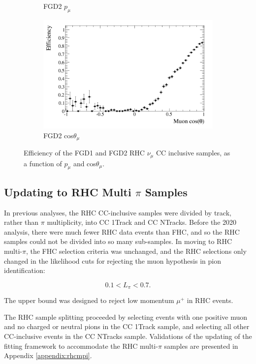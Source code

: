 \begin{figure}
\begin{subfigure}{.48\textwidth}
  \caption{FGD2 $p_{\mu}$}
\end{subfigure}
\begin{subfigure}{.48\textwidth}
  \centering
  \includegraphics[width=0.95\linewidth]{figs/effcosfgd2nuinnubar}
  \caption{FGD2 cos$\theta_{\mu}$}
\end{subfigure}
\caption{Efficiency of the FGD1 and FGD2 RHC $\nu_{\mu}$ CC inclusive samples, as a function of $p_{\mu}$ and cos$\theta_{\mu}$.}
\label{fig:nuinnubareff}
\end{figure}

\subsection{Updating to RHC Multi $\pi$ Samples}

In previous analyses, the RHC CC-inclusive samples were divided by track, rather than $\pi$ multiplicity, into CC 1Track and CC NTracks. Before the 2020 analysis, there were much fewer RHC data events than FHC, and so the RHC samples could not be divided into so many sub-samples. In moving to RHC multi-$\pi$, the FHC selection criteria was unchanged, and the RHC selections only changed in the likelihood cuts for rejecting the muon hypothesis in pion identification:

\begin{equation}
0.1 < L_{\pi} < 0.7.
\end{equation}

The upper bound was designed to reject low momentum $\mu^+$ in RHC events. 

The RHC sample splitting proceeded by selecting events with one positive muon and no charged or neutral pions in the CC 1Track sample, and selecting all other CC-inclusive events in the CC NTracks sample. Validations of the updating of the fitting framework to accommodate the RHC multi-$\pi$ samples are presented in Appendix \ref{appendix:rhcmpi}.

